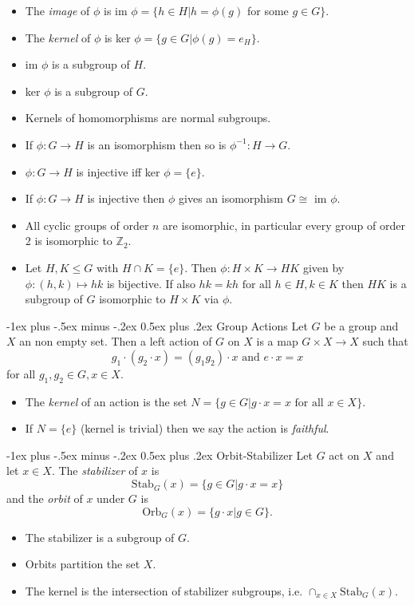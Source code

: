 \documentclass[10pt,landscape]{article}
\makeatletter
\renewcommand{\section}{\@startsection{section}{1}{0mm}%
                                {-1ex plus -.5ex minus -.2ex}%
                                {0.5ex plus .2ex}%
                                {\normalfont\large\bfseries}}
\makeatother
\begin{document}
\begin{multicols}{3}
\begin{itemize}
	\item The \emph{image} of $\phi$ is im $\phi = \{h \in H | h = \phi(g) $ for some $g \in G\}$. 
	\item The \emph{kernel} of $\phi$ is ker $\phi = \{g \in G | \phi(g) = e_H\}$. 
	\item im $\phi$ is a subgroup of $H$.
	\item ker $\phi$ is a subgroup of $G$.
	\item Kernels of homomorphisms are normal subgroups.
	\item If $\phi : G \rightarrow H$ is an isomorphism then so is $\phi^{-1} : H \rightarrow G$.
	\item $\phi : G \rightarrow H$ is injective iff ker $\phi = \{e\}$.
	\item If $\phi : G \rightarrow H$ is injective then $\phi$ gives an isomorphism $G \cong $ im $\phi$.
	\item All cyclic groups of order $n$ are isomorphic, in particular every group of order 2 is isomorphic to $\mathbb{Z}_2$.
	\item Let $H,K \leq G$ with $H\cap K = \{e\}$. Then $\phi: H \times K \rightarrow HK$ given by $\phi:(h,k) \mapsto hk$ is bijective. If also $hk=kh \text{ for all } h \in H, k\in K$ then $HK$ is a subgroup of $G$ isomorphic to $H \times K$ via $\phi$.
\end{itemize}

\section{Group Actions}
Let $G$ be a group and $X$ an non empty set. Then a left action of $G$ on $X$ is a map $G \times X \rightarrow X$ such that
$$g_1 \cdot (g_2 \cdot x) = (g_1g_2)\cdot x \text{ and } e \cdot x = x $$ for all $g_1,g_2 \in G, x\in X$.
 \begin{itemize}
 	\item The \emph{kernel} of an action is the set $N = \{g \in G| g \cdot x = x \text{ for all } x\in X\}$. 
	 \item If $N=\{e\}$ (kernel is trivial) then we say the action is \emph{faithful}.
 \end{itemize}

\section{Orbit-Stabilizer}
Let $G$ act on $X$ and let $x \in X$. The \emph{stabilizer} of $x$ is $$ \text{Stab}_G (x) = \{ g \in G | g \cdot x = x\} $$ and 
the \emph{orbit} of $x$ under $G$ is \[ \text{Orb}_G (x) = \{ g \cdot x | g \in G \}. \]
\begin{itemize}
	\item The stabilizer is a subgroup of $G$.
	\item Orbits partition the set $X$.
	\item The kernel is the intersection of stabilizer subgroups, i.e. $\cap_{x \in X} \text{Stab}_G (x)$.
\end{itemize}


\end{multicols}
\end{document}
